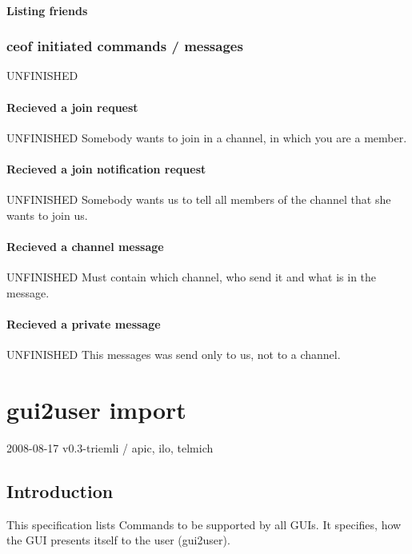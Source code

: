 \documentclass[12pt,a4paper]{book}
\begin{document}
\subsubsection{Listing friends}
\subsection{ceof initiated commands / messages}
UNFINISHED
\subsubsection{Recieved a join request}
UNFINISHED
Somebody wants to join in a channel, in which you are a member.
\subsubsection{Recieved a join notification request}
UNFINISHED
Somebody wants us to tell all members of the channel that she wants to join us.
\subsubsection{Recieved a channel message}
UNFINISHED
Must contain which channel, who send it and what is in the message.
\subsubsection{Recieved a private message}
UNFINISHED
This messages was send only to us, not to a channel.
\chapter{gui2user import}

2008-08-17 v0.3-triemli / apic, ilo, telmich

\section{Introduction}
This specification lists Commands to be supported by all GUIs. It
specifies, how the GUI presents itself to the user (gui2user).
\end{document}

